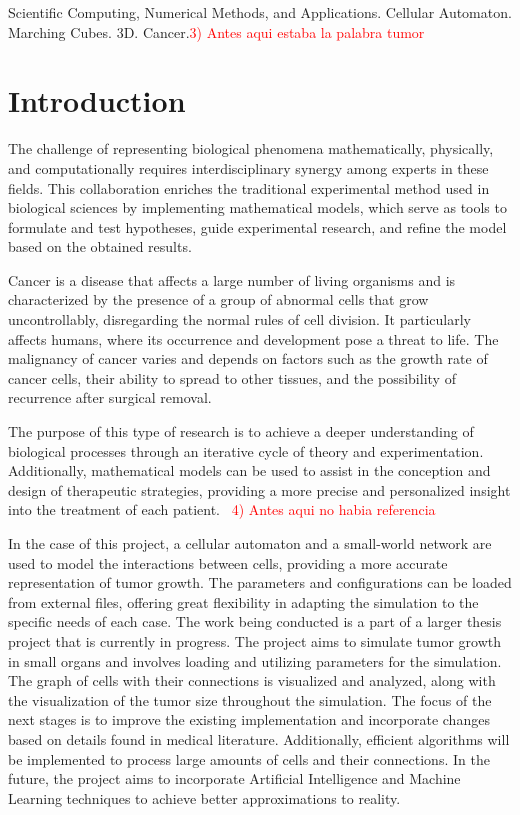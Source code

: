 \documentclass[a4paper,11pt]{article}
\begin{document}
{{\vskip 0.2cm  %


{\small{ %
 Scientific Computing, Numerical Methods, and Applications. Cellular Automaton. Marching Cubes. 3D. Cancer.\textcolor{red}{3) Antes aqui estaba la palabra tumor}
}}
}


\section*{Introduction}

The challenge of representing biological phenomena mathematically, physically, and computationally requires interdisciplinary synergy among experts in these fields. This collaboration enriches the traditional experimental method used in biological sciences by implementing mathematical models, which serve as tools to formulate and test hypotheses, guide experimental research, and refine the model based on the obtained results.~\cite{7}

Cancer is a disease that affects a large number of living organisms and is characterized by the presence of a group of abnormal cells that grow uncontrollably, disregarding the normal rules of cell division. It particularly affects humans, where its occurrence and development pose a threat to life. The malignancy of cancer varies and depends on factors such as the growth rate of cancer cells, their ability to spread to other tissues, and the possibility of recurrence after surgical removal.~\cite{7} 

The purpose of this type of research is to achieve a deeper understanding of biological processes through an iterative cycle of theory and experimentation. Additionally, mathematical models can be used to assist in the conception and design of therapeutic strategies, providing a more precise and personalized insight into the treatment of each patient.~\cite{7} \textcolor{red}{4) Antes aqui no habia referencia}

In the case of this project, a cellular automaton and a small-world network are used to model the interactions between cells, providing a more accurate representation of tumor growth. The parameters and configurations can be loaded from external files, offering great flexibility in adapting the simulation to the specific needs of each case. The work being conducted is a part of a larger thesis project that is currently in progress. The project aims to simulate tumor growth in small organs and involves loading and utilizing parameters for the simulation. The graph of cells with their connections is visualized and analyzed, along with the visualization of the tumor size throughout the simulation. The focus of the next stages is to improve the existing implementation and incorporate changes based on details found in medical literature. Additionally, efficient algorithms will be implemented to process large amounts of cells and their connections. In the future, the project aims to incorporate Artificial Intelligence and Machine Learning techniques to achieve better approximations to reality.

}
\end{document}
